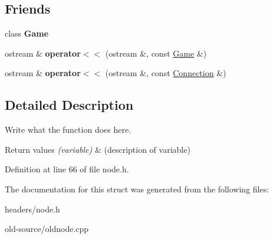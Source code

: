 \subsection*{Friends}
\begin{DoxyCompactItemize}
\item 
\hypertarget{classNode_aa2fab026580d6f14280c2ffb8063a314}{class {\bfseries Game}}\label{classNode_aa2fab026580d6f14280c2ffb8063a314}

\item 
\hypertarget{classNode_a7bb9176e07b6f6c73c930dba6400265f}{ostream \& {\bfseries operator$<$$<$} (ostream \&, const \hyperlink{classGame}{Game} \&)}\label{classNode_a7bb9176e07b6f6c73c930dba6400265f}

\item 
\hypertarget{classNode_a43649da031123d524f6605d2b0b4ebc8}{ostream \& {\bfseries operator$<$$<$} (ostream \&, const \hyperlink{structConnection}{Connection} \&)}\label{classNode_a43649da031123d524f6605d2b0b4ebc8}

\end{DoxyCompactItemize}


\subsection{Detailed Description}
Write what the function does here. 


\begin{DoxyRetVals}{Return values}
{\em (variable)} & (description of variable) \\
\hline
\end{DoxyRetVals}


Definition at line 66 of file node.\+h.



The documentation for this struct was generated from the following files\+:\begin{DoxyCompactItemize}
\item 
headers/node.\+h\item 
old-\/source/oldnode.\+cpp\end{DoxyCompactItemize}
